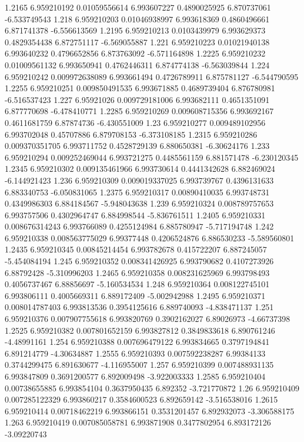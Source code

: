 {1.2165 6.959210192 0.01059556614 6.993607227 0.4890025925 6.870737061 -6.533749543
1.218 6.959210203 0.01046938997 6.993618369 0.4860496661 6.871741378 -6.556613569
1.2195 6.959210213 0.0103439979 6.993629373 0.4829354438 6.872751117 -6.569055887
1.221 6.959210223 0.01021940138 6.993640232 0.4796652856 6.873763092 -6.571164898
1.2225 6.959210232 0.01009561132 6.993650941 0.4762446311 6.874774138 -6.563039844
1.224 6.959210242 0.009972638089 6.993661494 0.4726789911 6.875781127 -6.544790595
1.2255 6.959210251 0.009850491535 6.993671885 0.4689739404 6.876780981 -6.516537423
1.227 6.95921026 0.009729181006 6.993682111 0.4651351091 6.877770698 -6.478410771
1.2285 6.959210269 0.009608715356 6.993692167 0.4611681759 6.87874736 -6.430551009
1.23 6.959210277 0.009489102956 6.993702048 0.45707886 6.879708153 -6.373108185
1.2315 6.959210286 0.009370351705 6.993711752 0.4528729139 6.880650381 -6.30624176
1.233 6.959210294 0.009252469044 6.993721275 0.4485561159 6.881571478 -6.230120345
1.2345 6.959210302 0.009135461966 6.993730614 0.4441342628 6.882469024 -6.144921423
1.236 6.959210309 0.009019337025 6.993739767 0.4396131633 6.883340753 -6.050831065
1.2375 6.959210317 0.00890410035 6.993748731 0.4349986303 6.884184567 -5.948043638
1.239 6.959210324 0.008789757653 6.993757506 0.4302964747 6.884998544 -5.836761511
1.2405 6.959210331 0.008676314243 6.993766089 0.4255124984 6.885780947 -5.717194748
1.242 6.959210338 0.008563775029 6.99377448 0.4206524876 6.886530233 -5.589560801
1.2435 6.959210345 0.00845214454 6.993782678 0.415722207 6.887245057 -5.454084194
1.245 6.959210352 0.008341426925 6.993790682 0.4107273926 6.88792428 -5.310996203
1.2465 6.959210358 0.008231625969 6.993798493 0.4056737467 6.88856697 -5.160534534
1.248 6.959210364 0.008122745101 6.993806111 0.4005669311 6.889172409 -5.002942988
1.2495 6.959210371 0.008014787403 6.993813536 0.3954125616 6.889740093 -4.838471137
1.251 6.959210376 0.007907755618 6.993820769 0.3902162027 6.89026973 -4.66737398
1.2525 6.959210382 0.007801652159 6.993827812 0.3849833618 6.890761246 -4.48991161
1.254 6.959210388 0.007696479122 6.993834665 0.3797194841 6.891214779 -4.30634887
1.2555 6.959210393 0.007592238287 6.99384133 0.3744299475 6.891630677 -4.116955007
1.257 6.959210399 0.007488931135 6.993847809 0.3691200577 6.892009498 -3.922003333
1.2585 6.959210404 0.00738655885 6.993854104 0.3637950435 6.892352 -3.721770872
1.26 6.959210409 0.007285122329 6.993860217 0.3584600523 6.892659142 -3.516538016
1.2615 6.959210414 0.00718462219 6.993866151 0.3531201457 6.892932073 -3.306588175
1.263 6.959210419 0.007085058781 6.993871908 0.3477802954 6.893172126 -3.09220743
}
